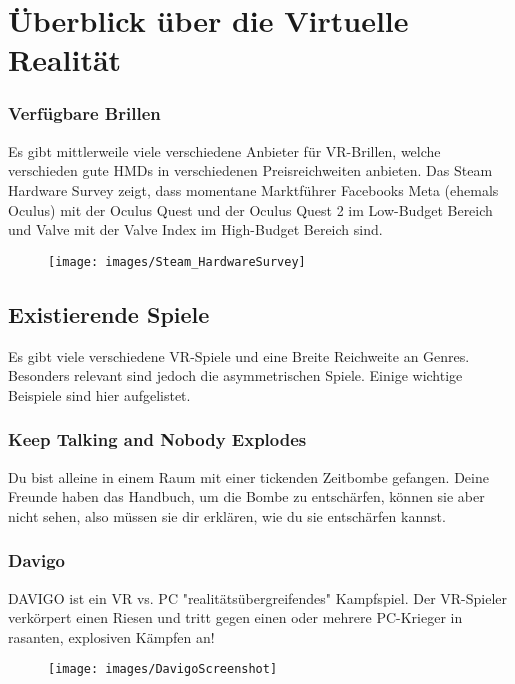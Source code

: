 \chapter{Überblick über die Virtuelle Realität}


\subsection{Verfügbare Brillen}
Es gibt mittlerweile viele verschiedene Anbieter für VR-Brillen, welche verschieden gute HMDs in verschiedenen Preisreichweiten anbieten.
Das Steam Hardware Survey zeigt, dass momentane Marktführer Facebooks Meta (ehemals Oculus) mit der Oculus Quest und der Oculus Quest 2 im Low-Budget Bereich und Valve mit der Valve Index im High-Budget Bereich sind.


\begin{figure}[H]
	\centering
	\texttt{[image: images/Steam\_HardwareSurvey]}
	\caption{\cite{_steam_hardware}}
\end{figure}

\section{Existierende Spiele}
Es gibt viele verschiedene VR-Spiele und eine Breite Reichweite an Genres. Besonders relevant sind jedoch die asymmetrischen Spiele. Einige wichtige Beispiele sind hier aufgelistet.

\subsection{Keep Talking and Nobody Explodes}
Du bist alleine in einem Raum mit einer tickenden Zeitbombe gefangen. Deine Freunde haben das Handbuch, um die Bombe zu entschärfen, können sie aber nicht sehen, also müssen sie dir erklären, wie du sie entschärfen kannst.
\cite{_steam_keeptalking}

\subsection{Davigo}
DAVIGO ist ein VR vs. PC "realitätsübergreifendes" Kampfspiel. Der VR-Spieler verkörpert einen Riesen und tritt gegen einen oder mehrere PC-Krieger in rasanten, explosiven Kämpfen an!

\begin{figure}[H]
	\centering
	\texttt{[image: images/DavigoScreenshot]}
	\caption{\cite{_steam_davigo}}
\end{figure}

